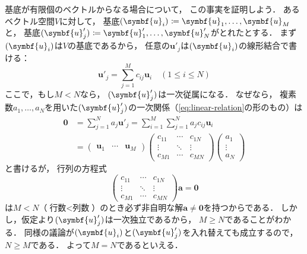 \documentclass[
]{sotsu}
\begin{document}
基底が有限個のベクトルからなる場合について，
この事実を証明しよう．
あるベクトル空間$V$に対して，
基底$\sequ{\symbf{u}_i} \coloneq \symbf{u}_1, \dots, \symbf{u}_M$と，
基底$\sequ{\symbf{u}'_j} \coloneq \symbf{u}'_1, \dots, \symbf{u}'_N$がとれたとする．
まず$\sequ{\symbf{u}_i}$は$V$の基底であるから，
任意の$\symbf{u}'_j$は$\sequ{\symbf{u}_i}$の線形結合で書ける：
\begin{equation*}
    \symbf{u}'_j = \sum_{j = 1}^{M} c_{ij} \symbf{u}_i
    \quad ( 1 \leq i \leq N )
\end{equation*}
ここで，もし$M < N$なら，
$\sequ{\symbf{u}'_j}$は一次従属になる．
なぜなら，
複素数$a_1, \dots, a_N$を用いた$\sequ{\symbf{u}'_j}$の一次関係（\cref{eq:linear-relation}の形のもの）は
\begin{equation*}
    \begin{split}
        \symbf{0} &= \sum_{j = 1}^{N} a_j \symbf{u}'_j
            = \sum_{i = 1}^{M} \sum_{j = 1}^{N} a_j c_{ij} \symbf{u}_i
            \\
            &= 
            \begin{pmatrix}
                \symbf{u}_1  &  \cdots  &  \symbf{u}_M
            \end{pmatrix}
            \begin{pmatrix}
                c_{11}  &  \cdots  &  c_{1N}  \\
                \vdots  &  \ddots  &  \vdots  \\
                c_{M1}  &  \cdots  &  c_{MN}
            \end{pmatrix}
            \begin{pmatrix}
                a_1  \\  \vdots  \\  a_N
            \end{pmatrix}
    \end{split}
\end{equation*}
と書けるが，
行列の方程式
\begin{equation*}
    \begin{pmatrix}
        c_{11}  &  \cdots  &  c_{1N}  \\
        \vdots  &  \ddots  &  \vdots  \\
        c_{M1}  &  \cdots  &  c_{MN}
    \end{pmatrix}
    \symbf{a}
    =
    \symbf{0}
\end{equation*}
は$M < N$（$\text{行数} < \text{列数}$）のとき必ず非自明な解$\symbf{a} \neq \symbf{0}$を持つからである．
しかし，仮定より$\sequ{\symbf{u}'_j}$は一次独立であるから，
$M \geq N$であることがわかる．
同様の議論が$\sequ{\symbf{u}_i}$と$\sequ{\symbf{u}'_j}$を入れ替えても成立するので，
$N \geq M$である．
よって$M = N$であるといえる．
\end{document}

